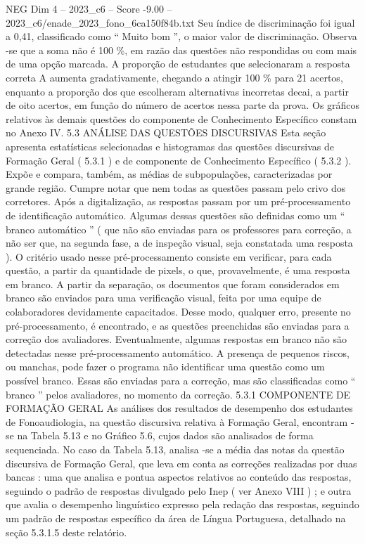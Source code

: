 \begin{textsample}{NEG Dim 4 – 2023\_c6 – Score -9.00 – 2023\_c6/enade\_2023\_fono\_6ca150f84b.txt}
Seu índice de discriminação foi igual a 0,41, classificado como “ Muito bom ”, o maior valor de discriminação.
Observa -se que a soma não é 100 \%, em razão das questões não respondidas ou com mais de uma opção marcada.
A proporção de estudantes que selecionaram a resposta correta A aumenta gradativamente, chegando a atingir 100 \% para 21 acertos, enquanto a proporção dos que escolheram alternativas incorretas decai, a partir de oito acertos, em função do número de acertos nessa parte da prova.
Os gráficos relativos às demais questões do componente de Conhecimento Específico constam no Anexo IV. 5.3 ANÁLISE DAS QUESTÕES DISCURSIVAS Esta seção apresenta estatísticas selecionadas e histogramas das questões discursivas de Formação Geral ( 5.3.1 ) e de componente de Conhecimento Específico ( 5.3.2 ).
Expõe e compara, também, as médias de subpopulações, caracterizadas por grande região.
Cumpre notar que nem todas as questões passam pelo crivo dos corretores.
Após a digitalização, as respostas passam por um pré-processamento de identificação automático.
Algumas dessas questões são definidas como um “ branco automático ” ( que não são enviadas para os professores para correção, a não ser que, na segunda fase, a de inspeção visual, seja constatada uma resposta ).
O critério usado nesse pré-processamento consiste em verificar, para cada questão, a partir da quantidade de pixels, o que, provavelmente, é uma resposta em branco.
A partir da separação, os documentos que foram considerados em branco são enviados para uma verificação visual, feita por uma equipe de colaboradores devidamente capacitados.
Desse modo, qualquer erro, presente no pré-processamento, é encontrado, e as questões preenchidas são enviadas para a correção dos avaliadores.
Eventualmente, algumas respostas em branco não são detectadas nesse pré-processamento automático.
A presença de pequenos riscos, ou manchas, pode fazer o programa não identificar uma questão como um possível branco.
Essas são enviadas para a correção, mas são classificadas como “ branco ” pelos avaliadores, no momento da correção. 5.3.1 COMPONENTE DE FORMAÇÃO GERAL As análises dos resultados de desempenho dos estudantes de Fonoaudiologia, na questão discursiva relativa à Formação Geral, encontram -se na Tabela 5.13 e no Gráfico 5.6, cujos dados são analisados de forma sequenciada.
No caso da Tabela 5.13, analisa -se a média das notas da questão discursiva de Formação Geral, que leva em conta as correções realizadas por duas bancas : uma que analisa e pontua aspectos relativos ao conteúdo das respostas, seguindo o padrão de respostas divulgado pelo Inep ( ver Anexo VIII ) ; e outra que avalia o desempenho linguístico expresso pela redação das respostas, seguindo um padrão de respostas específico da área de Língua Portuguesa, detalhado na seção 5.3.1.5 deste relatório.

\end{textsample}
